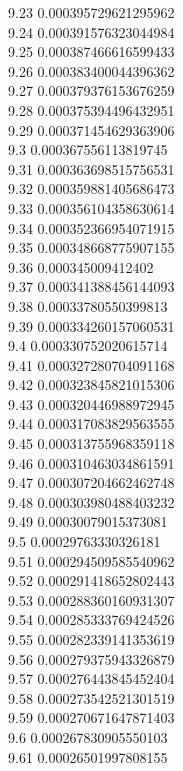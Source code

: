{9.23	0.000395729621295962\\
9.24	0.000391576323044984\\
9.25	0.000387466616599433\\
9.26	0.000383400044396362\\
9.27	0.000379376153676259\\
9.28	0.000375394496432951\\
9.29	0.000371454629363906\\
9.3	0.000367556113819745\\
9.31	0.000363698515756531\\
9.32	0.000359881405686473\\
9.33	0.000356104358630614\\
9.34	0.000352366954071915\\
9.35	0.000348668775907155\\
9.36	0.000345009412402\\
9.37	0.000341388456144093\\
9.38	0.00033780550399813\\
9.39	0.000334260157060531\\
9.4	0.000330752020615714\\
9.41	0.000327280704091168\\
9.42	0.000323845821015306\\
9.43	0.000320446988972945\\
9.44	0.000317083829563555\\
9.45	0.000313755968359118\\
9.46	0.000310463034861591\\
9.47	0.000307204662462748\\
9.48	0.000303980488403232\\
9.49	0.00030079015373081\\
9.5	0.00029763330326181\\
9.51	0.000294509585540962\\
9.52	0.000291418652802443\\
9.53	0.000288360160931307\\
9.54	0.000285333769424526\\
9.55	0.000282339141353619\\
9.56	0.000279375943326879\\
9.57	0.000276443845452404\\
9.58	0.000273542521301519\\
9.59	0.000270671647871403\\
9.6	0.000267830905550103\\
9.61	0.00026501997808155\\
}
